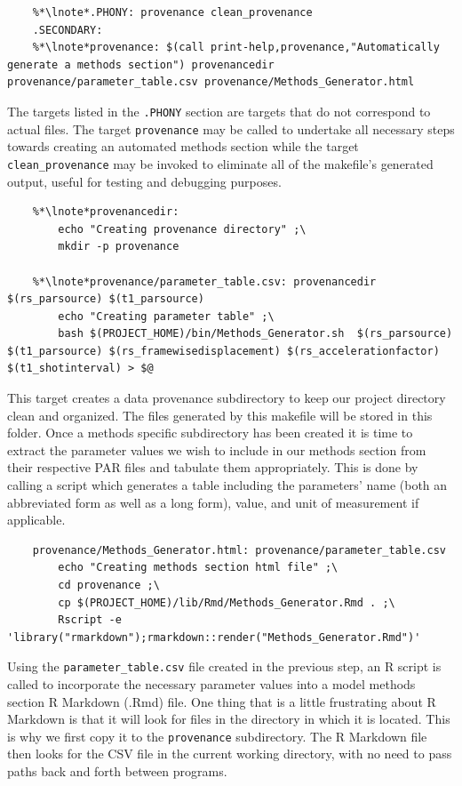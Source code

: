 \begin{lstlisting}
	%*\lnote*.PHONY: provenance clean_provenance
	.SECONDARY:
	%*\lnote*provenance: $(call print-help,provenance,"Automatically generate a methods section") provenancedir provenance/parameter_table.csv provenance/Methods_Generator.html
\end{lstlisting}

 The targets listed in the \texttt{.PHONY} section are targets that do not correspond to actual files. The target  \texttt{provenance} may be called to undertake all necessary steps towards creating an automated methods section while the target \texttt{clean_provenance} may be invoked to eliminate all of the makefile's generated output, useful for testing and debugging purposes.

\begin{lstlisting}
	%*\lnote*provenancedir: 
		echo "Creating provenance directory" ;\
		mkdir -p provenance
		
	%*\lnote*provenance/parameter_table.csv: provenancedir $(rs_parsource) $(t1_parsource)
		echo "Creating parameter table" ;\
		bash $(PROJECT_HOME)/bin/Methods_Generator.sh  $(rs_parsource) $(t1_parsource) $(rs_framewisedisplacement) $(rs_accelerationfactor) $(t1_shotinterval) > $@
\end{lstlisting}

 This target creates a data provenance subdirectory to keep our project directory clean and organized. The files generated by this makefile will be stored in this folder.  Once a methods specific subdirectory has been created it is time to extract the parameter values we wish to include in our methods section from their respective PAR files and tabulate them appropriately. This is done by  calling a \bashn{} script which generates a table including the parameters' name (both an abbreviated form as well as a long form), value, and unit of measurement if applicable.

\begin{lstlisting}
	provenance/Methods_Generator.html: provenance/parameter_table.csv
		echo "Creating methods section html file" ;\
		cd provenance ;\
		cp $(PROJECT_HOME)/lib/Rmd/Methods_Generator.Rmd . ;\
		Rscript -e 'library("rmarkdown");rmarkdown::render("Methods_Generator.Rmd")'
\end{lstlisting}

Using the \texttt{parameter_table.csv} file created in the previous step,  an R script is called to incorporate the necessary parameter values into a model methods section R Markdown (.Rmd) file. One thing that is a little frustrating about R Markdown is that it will look for files in the directory in which it is located. This is why we first copy it to the \texttt{provenance} subdirectory. The R Markdown file then looks for the CSV file in the current working directory, with no need to pass paths back and forth between programs. 

